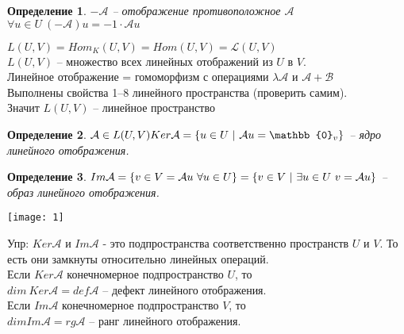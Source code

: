 \documentclass[12pt]{article}
\newtheorem{defin}{Определение}[subsection]
\theoremstyle{remark}
\theoremstyle{definition}
\newcommand{\0}{\mathbb{0}}
\newcommand{\mybox}{
	\collectbox{
		\setlength{\fboxsep}{1pt}
		\fbox{\BOXCONTENT}
	}
}
\newcommand{\A}{\mathcal{A}}
\newcommand{\B}{\mathcal{B}}
\begin{document}
	\begin{defin}
		$-\A$ -- отображение противоположное $\A$\\
		$\forall u \in U \ (-\A)u = -1 \cdot \A u$
	\end{defin}
	
	$L(U, V) = Hom_K(U, V) = Hom(U, V) = \mathcal{L}(U, V)$\\
	$L(U, V)$ -- множество всех линейных отображений из $U$ в $V$.\\
	Линейное отображение = гомоморфизм с операциями $\lambda \A$ и $\A + \B$\\
	Выполнены свойства 1--8 линейного пространства (проверить самим). \\Значит \mybox{$L(U, V)$ -- линейное пространство}
	\begin{defin}
		$\A \in L(U, V)\\
		Ker\A = \{u \in U \ | \ \A u = \0_v\}$ -- ядро линейного отображения. 
	\end{defin}
	\begin{defin}
		$Im\A =\{v \in V = \A u \ \forall u \in U\} = \\ \{v \in V \ | \  \exists u \in U \ v = \A u\}$ --
		образ линейного отображения.
	\end{defin}
	\texttt{[image: 1]}
	
	Упр: $Ker\A$ и $Im\A$ - это подпространства соответственно пространств $U$ и $V$. То есть они замкнуты относительно линейных операций. \\
	Если $Ker\A$ конечномерное подпространство $U$, то \\
	\mybox{$dim \ Ker\A = def\A$} -- дефект линейного отображения.\\
	Если $Im\A$ конечномерное подпространство $V$, то \\
	\mybox{$dimIm\A = rg\A$} -- ранг линейного отображения.
	
\end{document}

